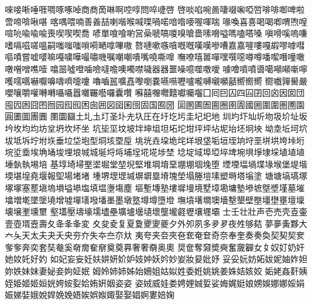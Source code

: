 唻󠄀唼󠄀唽󠄀唾󠄀啀󠄀啁󠄀啄󠄀啄󠄁啅󠄀商󠄀商󠄁啇󠄀啉󠄀啊󠄀啌󠄀啍󠄀問󠄀啐󠄀啑󠄀啓󠄀
啓󠄁啖󠄀啗󠄀啘󠄀啚󠄀啛󠄀啜󠄀啝󠄀啞󠄀啠󠄀啡󠄀啡󠄁啣󠄀啤󠄀啦󠄀啻󠄀啼󠄀啽󠄀啾󠄀啿󠄀
喀󠄀喁󠄀喂󠄀喃󠄀善󠄀善󠄁喆󠄀喇󠄀喈󠄀喉󠄀喊󠄀喋󠄀喎󠄀喏󠄀喑󠄀喒󠄀喓󠄀喔󠄀喗󠄀喘󠄀
喙󠄀喚󠄀喜󠄀喜󠄁喝󠄀喝󠄁喞󠄀喟󠄀喣󠄀喤󠄀喧󠄀喨󠄀喩󠄀喩󠄁喩󠄂喪󠄀喫󠄀喫󠄁喫󠄂喬󠄀
喭󠄀單󠄀喰󠄀喰󠄁喲󠄀営󠄀喿󠄀嗁󠄀嗃󠄀嗄󠄀嗅󠄀嗆󠄀嗇󠄀嗉󠄀嗋󠄀嗌󠄀嗎󠄀嗑󠄀嗒󠄀嗓󠄀
嗔󠄀嗗󠄀嗘󠄀嗚󠄀嗛󠄀嗜󠄀嗝󠄀嗞󠄀嗟󠄀嗢󠄀嗣󠄀嗤󠄀嗤󠄁嗤󠄂嗩󠄀嗬󠄀嗮󠄀嗱󠄀嗶󠄀嗷󠄀
嗸󠄀嗹󠄀嗽󠄀嗾󠄀嗿󠄀嘅󠄀嘅󠄁嘆󠄀嘆󠄁嘇󠄀嘈󠄀嘉󠄀嘉󠄁嘊󠄀嘍󠄀嘎󠄀嘏󠄀嘐󠄀嘑󠄀嘒󠄀
嘔󠄀嘖󠄀嘗󠄀嘘󠄀嘙󠄀嘛󠄀嘠󠄀嘨󠄀嘩󠄀嘬󠄀嘯󠄀嘰󠄀嘱󠄀嘲󠄀嘲󠄁嘳󠄀嘴󠄀嘵󠄀嘶󠄀嘷󠄀
嘸󠄀嘹󠄀嘻󠄀嘼󠄀嘽󠄀嘿󠄀噀󠄀噁󠄀噂󠄀噂󠄁噃󠄀噄󠄀噆󠄀噇󠄀噉󠄀噋󠄀噌󠄀噌󠄁噍󠄀噎󠄀
噏󠄀噐󠄀噓󠄀噔󠄀噛󠄀噞󠄀噠󠄀噡󠄀噢󠄀噣󠄀噤󠄀噦󠄀器󠄀器󠄁噩󠄀噪󠄀噫󠄀噬󠄀噭󠄀噯󠄀
噱󠄀噲󠄀噴󠄀噴󠄁噵󠄀噶󠄀噸󠄀噸󠄁噺󠄀嚀󠄀嚄󠄀嚅󠄀嚆󠄀嚇󠄀嚈󠄀嚊󠄀嚋󠄀嚌󠄀嚏󠄀嚔󠄀
嚕󠄀嚙󠄀嚚󠄀嚝󠄀嚞󠄀嚟󠄀嚠󠄀嚢󠄀嚥󠄀嚥󠄁嚦󠄀嚧󠄀嚨󠄀嚩󠄀嚫󠄀嚬󠄀嚭󠄀嚮󠄀嚮󠄁嚮󠄂
嚮󠄃嚱󠄀嚲󠄀嚳󠄀嚴󠄀嚶󠄀嚷󠄀嚼󠄀嚾󠄀囀󠄀囀󠄁囁󠄀囁󠄁囂󠄀囃󠄀囅󠄀囈󠄀囉󠄀囊󠄀囋󠄀
囌󠄀囍󠄀囎󠄀囎󠄁囏󠄀囐󠄀囑󠄀囓󠄀囗󠄀囘󠄀囙󠄀囚󠄀四󠄀囜󠄀囝󠄀回󠄀囟󠄀因󠄀囡󠄀団󠄀
囤󠄀囥󠄀囦󠄀囧󠄀囨󠄀囫󠄀园󠄀囮󠄀囮󠄁困󠄀囱󠄀囲󠄀図󠄀囶󠄀囷󠄀囹󠄀固󠄀国󠄀囿󠄀圀󠄀
圁󠄀圂󠄀圃󠄀圄󠄀圇󠄀圈󠄀圉󠄀圊󠄀國󠄀圌󠄀圍󠄀圍󠄁圏󠄀圑󠄀園󠄀圓󠄀圕󠄀圖󠄀團󠄀圚󠄀
圛󠄀圜󠄀圝󠄀土󠄀圠󠄀圡󠄀圢󠄀圣󠄀圤󠄀圥󠄀圦󠄀圧󠄀在󠄀圩󠄀圪󠄀圬󠄀圭󠄀圮󠄀圯󠄀地󠄀
圳󠄀圴󠄀圷󠄀圸󠄀圻󠄀圽󠄀圾󠄀圿󠄀址󠄀坂󠄀坅󠄀坆󠄀均󠄀均󠄁坊󠄀坌󠄀坍󠄀坎󠄀坏󠄀坐󠄀
坑󠄀坒󠄀坙󠄀坟󠄀坡󠄀坢󠄀坤󠄀坥󠄀坦󠄀坧󠄀坨󠄀坩󠄀坪󠄀坪󠄁坫󠄀坭󠄀坮󠄀坯󠄀坰󠄀坱󠄀
坳󠄀坴󠄀坵󠄀坷󠄀坹󠄀坺󠄀坻󠄀坼󠄀坾󠄀坿󠄀垁󠄀垂󠄀垃󠄀垈󠄀垉󠄀型󠄀垌󠄀垓󠄀垔󠄀垕󠄀
垗󠄀垙󠄀垚󠄀垜󠄀垝󠄀垞󠄀垟󠄀垠󠄀垡󠄀垢󠄀垣󠄀垤󠄀垧󠄀垨󠄀垩󠄀垪󠄀垬󠄀垮󠄀垰󠄀垳󠄀
垸󠄀垽󠄀埀󠄀埃󠄀埆󠄀埇󠄀埈󠄀埋󠄀埌󠄀城󠄀城󠄁埏󠄀埒󠄀埓󠄀埔󠄀埕󠄀埖󠄀埖󠄁埗󠄀埜󠄀
埝󠄀埞󠄀域󠄀埠󠄀埡󠄀埣󠄀埤󠄀埦󠄀埧󠄀埩󠄀埭󠄀埰󠄀埴󠄀埴󠄁埴󠄂埵󠄀埶󠄀執󠄀埸󠄀培󠄀
基󠄀埻󠄀埼󠄀埽󠄀埾󠄀埿󠄀堀󠄀堂󠄀堃󠄀堄󠄀堅󠄀堆󠄀堈󠄀堉󠄀堊󠄀堋󠄀堋󠄁堌󠄀堍󠄀堕󠄀
堙󠄀堙󠄁堛󠄀堝󠄀堞󠄀堟󠄀堠󠄀堡󠄀堤󠄀堦󠄀堧󠄀堪󠄀堭󠄀堯󠄀堰󠄀報󠄀堲󠄀場󠄀堵󠄀堵󠄁
堹󠄀堺󠄀堽󠄀堽󠄁堿󠄀塀󠄀塀󠄁塁󠄀塉󠄀塊󠄀塋󠄀塌󠄀塍󠄀塏󠄀塐󠄀塑󠄀塒󠄀塔󠄀塕󠄀塗󠄀
塘󠄀塘󠄁塙󠄀塙󠄁塚󠄀塚󠄁塚󠄂塞󠄀塟󠄀塡󠄀塢󠄀塤󠄀塧󠄀塨󠄀塩󠄀填󠄀塭󠄀塰󠄀塲󠄀塵󠄀
塸󠄀塹󠄀塼󠄀塾󠄀塿󠄀墀󠄀墁󠄀境󠄀墅󠄀墇󠄀墈󠄀墉󠄀墊󠄀墋󠄀墌󠄀墍󠄀墏󠄀墐󠄀墓󠄀墔󠄀
墖󠄀増󠄀墘󠄀墜󠄀墜󠄁墝󠄀增󠄀墟󠄀墠󠄀墡󠄀墢󠄀墦󠄀墨󠄀墨󠄁墩󠄀墪󠄀墫󠄀墫󠄁墮󠄀墱󠄀
墲󠄀墳󠄀墸󠄀墹󠄀墺󠄀墻󠄀墼󠄀墾󠄀壁󠄀壂󠄀壃󠄀壄󠄀壅󠄀壇󠄀壈󠄀壊󠄀壌󠄀壍󠄀壎󠄀壐󠄀
壑󠄀壒󠄀壓󠄀壔󠄀壕󠄀壖󠄀壗󠄀壘󠄀壙󠄀壚󠄀壜󠄀壝󠄀壞󠄀壟󠄀壠󠄀壡󠄀壢󠄀壤󠄀壥󠄀壩󠄀
士󠄀壬󠄀壮󠄀壯󠄀声󠄀壱󠄀売󠄀壳󠄀壴󠄀壷󠄀壹󠄀壺󠄀壻󠄀壼󠄀壽󠄀夂󠄀夅󠄀夆󠄀夆󠄁変󠄀
夊󠄀夋󠄀夌󠄀复󠄀夏󠄀夐󠄀夒󠄀夓󠄀夔󠄀夕󠄀外󠄀夘󠄀夙󠄀多󠄀夛󠄀夛󠄁夜󠄀夝󠄀够󠄀夡󠄀
夢󠄀夣󠄀夤󠄀夥󠄀大󠄀大󠄁夨󠄀天󠄀太󠄀夫󠄀夬󠄀夭󠄀央󠄀夯󠄀夰󠄀失󠄀夲󠄀夳󠄀夵󠄀夶󠄀
夷󠄀夸󠄀夹󠄀夽󠄀夾󠄀夿󠄀奃󠄀奄󠄀奆󠄀奇󠄀奈󠄀奉󠄀奎󠄀奏󠄀奏󠄁奐󠄀契󠄀契󠄁契󠄂奒󠄀
奓󠄀奓󠄁奔󠄀奕󠄀套󠄀奘󠄀奙󠄀奚󠄀奛󠄀奝󠄀奞󠄀奟󠄀奠󠄀奠󠄁奡󠄀奢󠄀奢󠄁奣󠄀奥󠄀奧󠄀
奨󠄀奩󠄀奪󠄀奫󠄀奬󠄀奭󠄀奮󠄀奯󠄀奲󠄀女󠄀女󠄁奴󠄀奵󠄀奶󠄀奸󠄀她󠄀奻󠄀奼󠄀好󠄀妁󠄀
如󠄀妃󠄀妄󠄀妄󠄁妊󠄀妋󠄀妌󠄀妍󠄀妎󠄀妒󠄀妓󠄀妕󠄀妖󠄀妗󠄀妙󠄀妛󠄀妝󠄀妟󠄀妣󠄀妤󠄀
妥󠄀妥󠄁妧󠄀妨󠄀妬󠄀妭󠄀妮󠄀妯󠄀妰󠄀妲󠄀妳󠄀妷󠄀妹󠄀妺󠄀妻󠄀妼󠄀妾󠄀姁󠄀姃󠄀姄󠄀
姆󠄀姈󠄀姉󠄀姉󠄁姊󠄀始󠄀姍󠄀姐󠄀姑󠄀姒󠄀姓󠄀委󠄀姙󠄀姚󠄀姚󠄁姜󠄀姝󠄀姞󠄀姟󠄀姣󠄀
姤󠄀姥󠄀姦󠄀姧󠄀姨󠄀姪󠄀姫󠄀姬󠄀姬󠄁姮󠄀姯󠄀姱󠄀姲󠄀姴󠄀姶󠄀姷󠄀姸󠄀姻󠄀姿󠄀姿󠄁
姿󠄂娀󠄀威󠄀娃󠄀娄󠄀娉󠄀娌󠄀娍󠄀娎󠄀娑󠄀娒󠄀娓󠄀娗󠄀娘󠄀娚󠄀娛󠄀娜󠄀娜󠄁娞󠄀娟󠄀
娠󠄀娣󠄀娤󠄀娥󠄀娧󠄀娨󠄀娩󠄀娩󠄁娪󠄀娭󠄀娯󠄀娰󠄀娵󠄀娶󠄀娶󠄁娼󠄀婀󠄀婁󠄀婄󠄀婅󠄀
